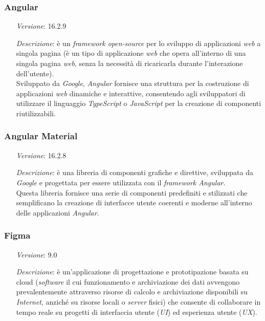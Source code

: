     \subsubsection*{Angular}
        \begin{itemize}
            \item [\textit{Versione}:] 16.2.9
            \item [\textit{Descrizione}:] è un \textit{framework open-source} per lo sviluppo di applicazioni \textit{web} a singola pagina (è un tipo di applicazione \textit{web} che opera all'interno di una singola pagina \textit{web}, senza la necessità di ricaricarla durante l'interazione dell'utente). \\ 
                    Sviluppato da \textit{Google}, \textit{Angular} fornisce una struttura per la costruzione di applicazioni \textit{web} dinamiche e interattive, consentendo agli sviluppatori di utilizzare il linguaggio \textit{TypeScript} o \textit{JavaScript} per la creazione di componenti riutilizzabili.
        \end{itemize}
    \subsubsection*{Angular Material}
    \begin{itemize}
        \item [\textit{Versione}:] 16.2.8
        \item [\textit{Descrizione}:] è una libreria di componenti grafiche e direttive, sviluppata da \textit{Google} e progettata per essere utilizzata con il \textit{framework Angular}. \\
                     Questa libreria fornisce una serie di componenti predefiniti e stilizzati che semplificano la creazione di interfacce utente coerenti e moderne all'interno delle applicazioni \textit{Angular}.
    \end{itemize}

    \subsubsection*{Figma}
    \begin{itemize}
        \item [\textit{Versione}:] 9.0
        \item [\textit{Descrizione}:] è un'applicazione di progettazione e prototipazione basata su cloud (\textit{software} il cui funzionamento e archiviazione dei dati avvengono prevalentemente attraverso risorse di calcolo e archiviazione disponibili su \textit{Internet}, anziché su risorse locali o \textit{server} fisici) 
                    che consente di collaborare in tempo reale su progetti di interfaccia utente (\textit{UI}) ed esperienza utente (\textit{UX}).
    \end{itemize}

